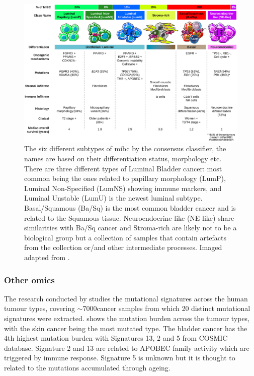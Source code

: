 \begin{figure}[!htb]   
\centering
\includegraphics[width=1.0\textwidth,height=1.0\textheight,keepaspectratio]{Sections/Lit_review/Resources/2020_consensus_subtypes.jpg}
  \caption{The six different subtypes of \acrfull{mibc} by the consensus classifier\cite{Kamoun2020-tj}, the names are based on their differentiation status, morphology etc. There are three different types of Luminal Bladder cancer: most common being the ones related to papillary morphology (LumP), Luminal Non-Specified (LumNS) showing immune markers, and Luminal Unstable (LumU) is the newest luminal subtype. Basal/Squamous (Ba/Sq) is the most common bladder cancer and is related to the Squamous tissue. Neuroendocrine-like (NE-like) share similarities with Ba/Sq cancer and Stroma-rich are likely not to be a biological group but a collection of samples that contain artefacts from the collection or/and other intermediate processes. Imaged adapted from \cite{Kamoun2020-tj}.
}
\label{fig:2020_consens}
\end{figure}
\FloatBarrier


\subsubsection{Other omics}

The research conducted by \citet{Alexandrov2013-gi} studies the mutational signatures across the human tumour types, covering $\sim7000 $cancer samples from which 20 distinct mutational signatures were extracted.  shows the mutation burden across the tumour types, with the skin cancer being the most mutated type. The bladder cancer has the 4th highest mutation burden with Signatures 13, 2 and 5 from COSMIC database\cite{Tate2019-yj}. Signature 2 and 13 are related to APOBEC family activity which are triggered by immune response. Signature 5 is unknown but it is thought to related to the mutations accumulated through ageing. 

